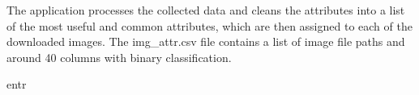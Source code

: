 \documentclass{article}
\begin{document}
The application processes the collected data and cleans the attributes into a list of the most useful and common attributes, which are then assigned to each of the downloaded images. The img\_attr.csv file contains a list of image file paths and around 40 columns with binary classification.

entr

\newpage


\end{document}
